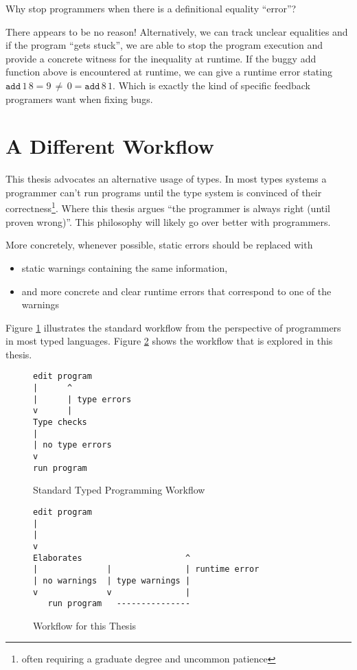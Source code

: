 Why stop programmers when there is a definitional equality ``error''? 

There appears to be no reason! Alternatively, we can track unclear equalities and if the program ``gets stuck'', we are able to stop the program execution and provide a concrete witness for the inequality at runtime.
If the buggy add function above is encountered at runtime, we can give a runtime error stating $\mathtt{add}\,1\,8=9\,\neq\,0=\mathtt{add}\,8\,1$.
Which is exactly the kind of specific feedback programers want when fixing bugs.

\section{A Different Workflow}

This thesis advocates an alternative usage of types. In most types systems a programmer can't run programs until the type system is convinced of their correctness\footnote{
 often requiring a graduate degree and uncommon patience}.
Where this thesis argues ``the programmer is always right (until proven wrong)''.
This philosophy will likely go over better with programmers.

More concretely, whenever possible, static errors should be replaced with
\begin{itemize}
\item static warnings containing the same information,
\item and more concrete and clear runtime errors that correspond to one of the warnings
\end{itemize}
Figure \ref{fig:intro-standard-workflow} illustrates the standard workflow from the perspective of programmers in most typed languages.
Figure \ref{fig:intro-thesis-workflow} shows the workflow that is explored in this thesis.

\begin{figure}
\begin{lstlisting}
edit program
|      ^
|      | type errors
v      |
Type checks
|
| no type errors
v
run program
\end{lstlisting}


\caption{Standard Typed Programming Workflow}
\label{fig:intro-standard-workflow}
\end{figure}

\begin{figure}
\begin{lstlisting}
edit program
|     
|     
v
Elaborates                     ^
|              |               | runtime error
| no warnings  | type warnings |
v              v               |
   run program   ---------------
\end{lstlisting}


\caption{Workflow for this Thesis}
\label{fig:intro-thesis-workflow}
\end{figure}

